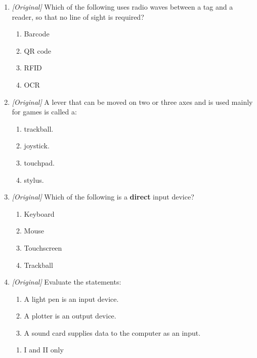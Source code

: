 \begin{enumerate}[label=\textbf{Q\arabic*.}, leftmargin=*]
  fingerprint or iris for identification?
  \begin{enumerate}[label=\Alph*.]
    \item Biometric sensor
    \item Barcode reader
    \item RFID tag
    \item Joystick
  \end{enumerate}
\item \textit{[Original]} Which of the following uses radio waves between a
  tag and a reader, so that no line of sight is required?
  \begin{enumerate}[label=\Alph*.]
    \item Barcode
    \item QR code
    \item RFID
    \item OCR
  \end{enumerate}
\item \textit{[Original]} A lever that can be moved on two or three axes and
  is used mainly for games is called a:
  \begin{enumerate}[label=\Alph*.]
    \item trackball.
    \item joystick.
    \item touchpad.
    \item stylus.
  \end{enumerate}
\item \textit{[Original]} Which of the following is a \textbf{direct} input
  device?
  \begin{enumerate}[label=\Alph*.]
    \item Keyboard
    \item Mouse
    \item Touchscreen
    \item Trackball
  \end{enumerate}
\item \textit{[Original]} Evaluate the statements:
  \begin{enumerate}[label=\Roman*.]
    \item A light pen is an input device.
    \item A plotter is an output device.
    \item A sound card supplies data to the computer as an input.
  \end{enumerate}
  \begin{enumerate}[label=\Alph*.]
    \item I and II only

\end{enumerate}
\end{enumerate}
